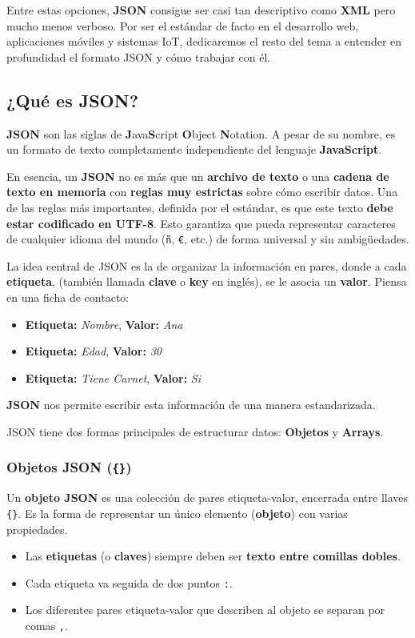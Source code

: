 Entre estas opciones, \textbf{JSON} consigue ser casi tan descriptivo como \textbf{XML} pero mucho menos verboso. Por ser el estándar de facto en el desarrollo web, aplicaciones móviles y sistemas IoT, dedicaremos el resto del tema a entender en profundidad el formato JSON y cómo trabajar con él.

\subsection{¿Qué es JSON?}

\textbf{JSON} son las siglas de \textbf{J}ava\textbf{S}cript \textbf{O}bject \textbf{N}otation. A pesar de su nombre, es un formato de texto completamente independiente del lenguaje \textbf{JavaScript}.

En esencia, un \textbf{JSON} no es más que un \textbf{archivo de texto} o una \textbf{cadena de texto en memoria} con \textbf{reglas muy estrictas} sobre cómo escribir datos. Una de las reglas más importantes, definida por el estándar, es que este texto \textbf{debe estar codificado en UTF-8}. Esto garantiza que pueda representar caracteres de cualquier idioma del mundo (\texttt{ñ}, \texttt{€}, etc.) de forma universal y sin ambigüedades.


La idea central de JSON es la de organizar la información en pares, donde a cada \textbf{etiqueta}, (también llamada \textbf{clave} o \textbf{key} en inglés), se le asocia un \textbf{valor}. Piensa en una ficha de contacto:
\begin{itemize}
    \item \textbf{Etiqueta:} \textit{Nombre}, \textbf{Valor:} \textit{Ana}
    \item \textbf{Etiqueta:} \textit{Edad}, \textbf{Valor:} \textit{30}
    \item \textbf{Etiqueta:} \textit{Tiene Carnet}, \textbf{Valor:} \textit{Si}
\end{itemize}
\textbf{JSON} nos permite escribir esta información de una manera estandarizada.

JSON tiene dos formas principales de estructurar datos: \textbf{Objetos} y \textbf{Arrays}.



\subsubsection{Objetos JSON (\texttt{\{\}})}
Un \textbf{objeto JSON} es una colección de pares etiqueta-valor, encerrada entre llaves \texttt{\{\}}. Es la forma de representar un único elemento (\textbf{objeto}) con varias propiedades.
\begin{itemize}
    \item Las \textbf{etiquetas} (o \textbf{claves}) siempre deben ser \textbf{texto entre comillas dobles}.
    \item Cada etiqueta va seguida de dos puntos \texttt{:}.
    \item Los diferentes pares etiqueta-valor que describen al objeto se separan por comas \texttt{,}.
\end{itemize}


